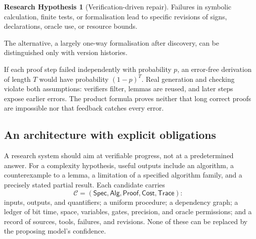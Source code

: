 \documentclass[11pt,reqno]{amsart}
\numberwithin{equation}{section}
\theoremstyle{plain}
\theoremstyle{definition}
\newtheorem{hypothesis}[theorem]{Research Hypothesis}
\theoremstyle{remark}
\begin{document}
\begin{hypothesis}[Verification-driven repair]
Failures in symbolic calculation, finite tests, or formalisation lead to
specific revisions of signs, declarations, oracle use, or resource bounds.
\end{hypothesis}
\noindent The alternative, a largely one-way formalisation after discovery,
can be distinguished only with version histories.

If each proof step failed independently with probability $p$, an error-free
derivation of length $T$ would have probability $(1-p)^T$. Real generation and
checking violate both assumptions: verifiers filter, lemmas are reused, and
later steps expose earlier errors. The product formula proves neither that
long correct proofs are impossible nor that feedback catches every error.

\subsection{An architecture with explicit obligations}\label{sec:architecture}
A research system should aim at verifiable progress, not at a predetermined
answer. For a complexity hypothesis, useful outputs include an algorithm, a
counterexample to a lemma, a limitation of a specified algorithm family, and a
precisely stated partial result. Each candidate carries
\begin{equation}\label{eq:artifact}
 \mathcal C=(\mathsf{Spec},\mathsf{Alg},\mathsf{Proof},\mathsf{Cost},
 \mathsf{Trace}):
\end{equation}
inputs, outputs, and quantifiers; a uniform procedure; a dependency graph; a
ledger of bit time, space, variables, gates, precision, and oracle
permissions; and a record of sources, tools, failures, and revisions. None of
these can be replaced by the proposing model's confidence.
\end{document}

